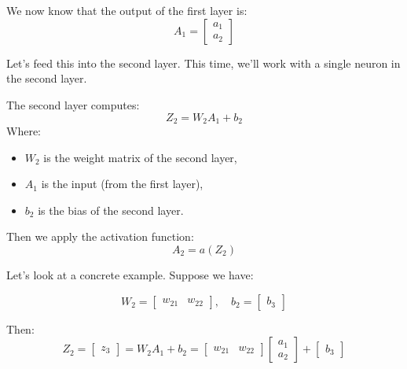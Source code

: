 \documentclass[11pt]{article}
\begin{document}
\section*{}

We now know that the output of the first layer is:
\[
A_1 =
\begin{bmatrix}
a_1 \\
a_2
\end{bmatrix}
\]

Let’s feed this into the second layer.  
This time, we’ll work with a single neuron in the second layer.

\vspace{1em}

\begin{tcolorbox}[colback=blue!5!white, colframe=blue!80!black, title=Layer 2 Computation]
The second layer computes:
\[
Z_2 = W_2 A_1 + b_2
\]
Where:
\begin{itemize}
  \item $W_2$ is the weight matrix of the second layer,
  \item $A_1$ is the input (from the first layer),
  \item $b_2$ is the bias of the second layer.
\end{itemize}
\end{tcolorbox}

\vspace{1em}

Then we apply the activation function:
\[
A_2 = a(Z_2)
\]

Let’s look at a concrete example.  
Suppose we have:

\[
W_2 = \begin{bmatrix} w_{21} & w_{22} \end{bmatrix}, \quad
b_2 = \begin{bmatrix} b_3 \end{bmatrix}
\]

Then:
\[
Z_2 = 
\begin{bmatrix}
z_3
\end{bmatrix}
= W_2 A_1 + b_2 = 
\begin{bmatrix}
w_{21} & w_{22}
\end{bmatrix}
\begin{bmatrix}
a_1 \\
a_2
\end{bmatrix}
+
\begin{bmatrix}
b_3
\end{bmatrix}
\]
\end{document}
